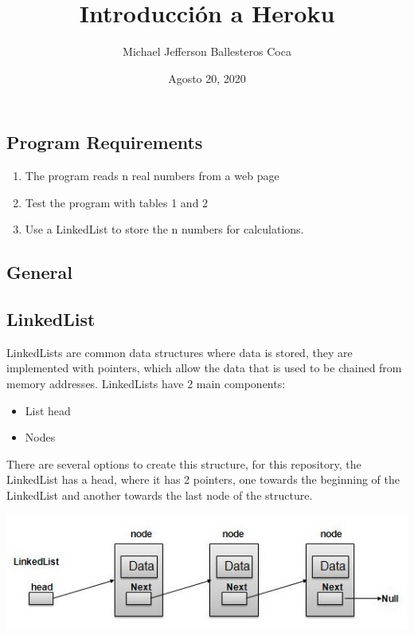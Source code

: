 \documentclass[
	12pt, %
]{fphw}
\title{Introducción a Heroku} %
\author{Michael Jefferson Ballesteros Coca} %
\date{Agosto 20, 2020} %
\institute{Escuela Colombiana de Ingeniería Julio Garavito \\ Decanatura Ingeniería de Sistemas} %
\begin{document}
\maketitle %



\subsection * {Program Requirements}

\begin {enumerate} [(a \normalfont)]%
\item The program reads n real numbers from a web page
\item Test the program with tables 1 and 2
\item Use a LinkedList to store the n numbers for calculations.
\end {enumerate}

\subsection * {General}

\subsection * {LinkedList}

LinkedLists are common data structures where data is stored, they are implemented with pointers, which allow the data that is used to be chained from memory addresses.
LinkedLists have 2 main components:
\begin {itemize}
\item List head
\item Nodes
\end {itemize}

There are several options to create this structure, for this repository, the LinkedList has a head, where it has 2 pointers, one towards the beginning of the LinkedList and another towards the last node of the structure.

\includegraphics [scale = 0.8] {OgP3r.jpg}
\end{document}

